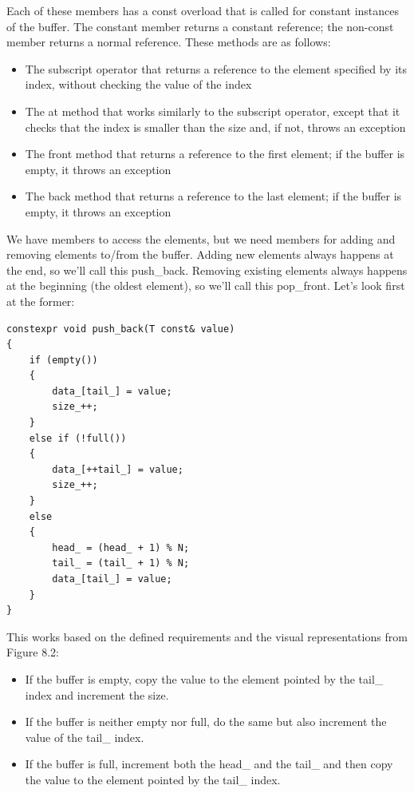 Each of these members has a const overload that is called for constant instances of the buffer. The constant member returns a constant reference; the non-const member returns a normal reference. These methods are as follows:

\begin{itemize}
\item
The subscript operator that returns a reference to the element specified by its index, without checking the value of the index

\item
The at method that works similarly to the subscript operator, except that it checks that the index is smaller than the size and, if not, throws an exception

\item
The front method that returns a reference to the first element; if the buffer is empty, it throws an exception

\item
The back method that returns a reference to the last element; if the buffer is empty, it throws an exception
\end{itemize}

We have members to access the elements, but we need members for adding and removing elements to/from the buffer. Adding new elements always happens at the end, so we’ll call this push\_back. Removing existing elements always happens at the beginning (the oldest element), so we’ll call this pop\_front. Let’s look first at the former:

\begin{lstlisting}[style=styleCXX]
constexpr void push_back(T const& value)
{
	if (empty())
	{
		data_[tail_] = value;
		size_++;
	}
	else if (!full())
	{
		data_[++tail_] = value;
		size_++;
	}
	else
	{
		head_ = (head_ + 1) % N;
		tail_ = (tail_ + 1) % N;
		data_[tail_] = value;
	}
}
\end{lstlisting}

This works based on the defined requirements and the visual representations from Figure 8.2:

\begin{itemize}
\item
If the buffer is empty, copy the value to the element pointed by the tail\_ index and increment the size.

\item
If the buffer is neither empty nor full, do the same but also increment the value of the tail\_ index.

\item
If the buffer is full, increment both the head\_ and the tail\_ and then copy the value to the element pointed by the tail\_ index.
\end{itemize}

